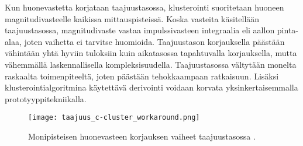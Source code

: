 \documentclass[finnish,12pt]{article}
\begin{document}
Kun huonevastetta korjataan taajuustasossa, klusterointi suoritetaan huoneen magnitudivasteelle kaikissa mittauspisteissä. Koska vasteita käsitellään taajuustasossa, magnitudivaste vastaa impulssivasteen integraalia eli aallon pinta-alaa, joten vaihetta ei tarvitse huomioida. Taajuustason korjauksella päästään vähintään yhtä hyviin tuloksiin kuin aikatasossa tapahtuvalla korjauksella, mutta vähemmällä laskennallisella kompleksisuudella. Taajuustasossa vältytään monelta raskaalta toimenpiteeltä, joten päästään tehokkaampaan ratkaisuun. Lisäksi klusterointialgoritmina käytettävä derivointi voidaan korvata yksinkertaisemmalla prototyyppitekniikalla. \cite{ACarini2012}

\begin{figure}[h!]
	\centering
	\texttt{[image: taajuus\_c-cluster\_workaround.png]}
	\caption{Monipisteisen huonevasteen korjauksen vaiheet taajuustasossa \cite{ACarini2012}.}
	\label{fig:freqDomain}
\end{figure}
\end{document}

